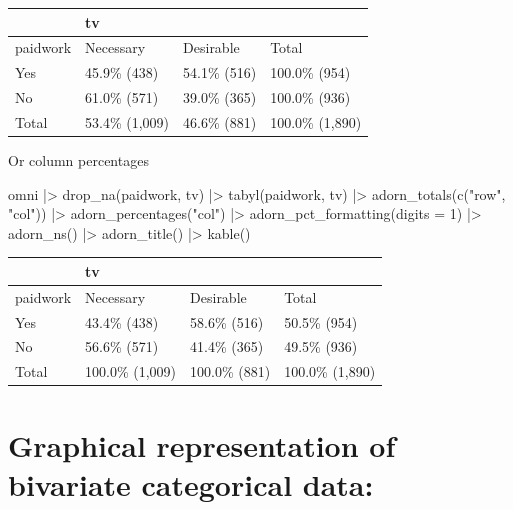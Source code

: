 \documentclass[
  letterpaper,
  DIV=11,
  numbers=noendperiod]{scrreprt}
\newenvironment{Shaded}{\begin{snugshade}}{\end{snugshade}}
\newcommand{\AttributeTok}[1]{\textcolor[rgb]{0.40,0.45,0.13}{#1}}
\newcommand{\DecValTok}[1]{\textcolor[rgb]{0.68,0.00,0.00}{#1}}
\newcommand{\FunctionTok}[1]{\textcolor[rgb]{0.28,0.35,0.67}{#1}}
\newcommand{\NormalTok}[1]{\textcolor[rgb]{0.00,0.23,0.31}{#1}}
\newcommand{\SpecialCharTok}[1]{\textcolor[rgb]{0.37,0.37,0.37}{#1}}
\newcommand{\StringTok}[1]{\textcolor[rgb]{0.13,0.47,0.30}{#1}}
\newcounter{none} %
\begin{document}
{\def\LTcaptype{none} %
\begin{longtable}[]{@{}llll@{}}
\toprule\noalign{}
& tv & & \\
\midrule\noalign{}
\endhead
\bottomrule\noalign{}
\endlastfoot
paidwork & Necessary & Desirable & Total \\
Yes & 45.9\% (438) & 54.1\% (516) & 100.0\% (954) \\
No & 61.0\% (571) & 39.0\% (365) & 100.0\% (936) \\
Total & 53.4\% (1,009) & 46.6\% (881) & 100.0\% (1,890) \\
\end{longtable}
}

Or column percentages

\begin{Shaded}
\begin{Highlighting}[]
\NormalTok{omni }\SpecialCharTok{|\textgreater{}} 
  \FunctionTok{drop\_na}\NormalTok{(paidwork, tv) }\SpecialCharTok{|\textgreater{}} 
  \FunctionTok{tabyl}\NormalTok{(paidwork, tv) }\SpecialCharTok{|\textgreater{}} 
  \FunctionTok{adorn\_totals}\NormalTok{(}\FunctionTok{c}\NormalTok{(}\StringTok{"row"}\NormalTok{, }\StringTok{"col"}\NormalTok{)) }\SpecialCharTok{|\textgreater{}} 
  \FunctionTok{adorn\_percentages}\NormalTok{(}\StringTok{"col"}\NormalTok{) }\SpecialCharTok{|\textgreater{}} 
  \FunctionTok{adorn\_pct\_formatting}\NormalTok{(}\AttributeTok{digits =} \DecValTok{1}\NormalTok{) }\SpecialCharTok{|\textgreater{}} 
  \FunctionTok{adorn\_ns}\NormalTok{() }\SpecialCharTok{|\textgreater{}} 
  \FunctionTok{adorn\_title}\NormalTok{() }\SpecialCharTok{|\textgreater{}} 
  \FunctionTok{kable}\NormalTok{()}
\end{Highlighting}
\end{Shaded}

{\def\LTcaptype{none} %
\begin{longtable}[]{@{}llll@{}}
\toprule\noalign{}
& tv & & \\
\midrule\noalign{}
\endhead
\bottomrule\noalign{}
\endlastfoot
paidwork & Necessary & Desirable & Total \\
Yes & 43.4\% (438) & 58.6\% (516) & 50.5\% (954) \\
No & 56.6\% (571) & 41.4\% (365) & 49.5\% (936) \\
Total & 100.0\% (1,009) & 100.0\% (881) & 100.0\% (1,890) \\
\end{longtable}
}

\section{Graphical representation of bivariate categorical
data:}\label{graphical-representation-of-bivariate-categorical-data}
\end{document}

